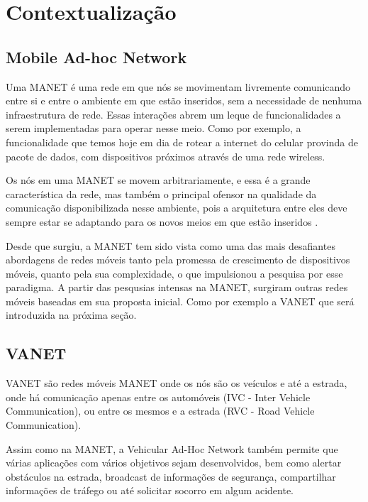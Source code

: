 \documentclass[12pt, %
openright, 
oneside,
a4paper,
brazil]{facom-ufu-abntex2}
\begin{document}
\section{Contextualização}
\subsection{Mobile Ad-hoc Network}
Uma \ac{MANET}  é uma rede em que nós se movimentam livremente comunicando entre si e entre o ambiente em que estão inseridos, sem a necessidade de nenhuma infraestrutura de rede. Essas interações abrem um leque de funcionalidades a serem implementadas para operar nesse meio. Como por exemplo, a funcionalidade que temos hoje em dia de rotear a internet do celular provinda de pacote de dados, com dispositivos próximos através de uma rede wireless.

Os nós em uma MANET se movem arbitrariamente, e essa é a grande característica da rede, mas também o principal ofensor na qualidade da comunicação disponibilizada nesse ambiente, pois a arquitetura entre eles deve sempre estar se adaptando para os novos meios em que estão inseridos \cite{de2002mobile}.

Desde que surgiu, a MANET tem sido vista como uma das mais desafiantes abordagens de redes móveis tanto pela promessa de crescimento de dispositivos móveis, quanto pela sua complexidade, o que impulsionou a pesquisa por esse paradigma. A partir das pesqusias intensas na MANET, surgiram outras redes móveis baseadas em sua proposta inicial. Como por exemplo a VANET que será introduzida na próxima seção.



\subsection{VANET}
VANET  são redes móveis MANET onde os nós são os veículos e até a estrada, onde há comunicação apenas entre os automóveis (IVC - Inter Vehicle Communication), ou entre os mesmos e a estrada (RVC - Road Vehicle Communication).

Assim como na MANET, a Vehicular Ad-Hoc Network também permite que várias aplicações com vários objetivos sejam desenvolvidos, bem como alertar obstáculos na estrada, broadcast de informações de segurança, compartilhar informações de tráfego ou até solicitar socorro em algum acidente.
\end{document}
